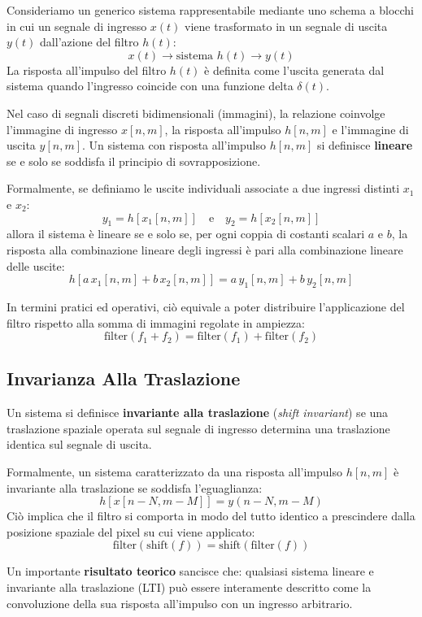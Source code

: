 ﻿\documentclass[11pt, a4paper]{article}
\begin{document}
Consideriamo un generico sistema rappresentabile mediante uno schema a blocchi in cui un segnale di ingresso $x(t)$ viene trasformato in un segnale di uscita $y(t)$ dall'azione del filtro $h(t)$:
\[ x(t) \longrightarrow \boxed{\text{sistema } h(t)} \longrightarrow y(t) \]
La risposta all'impulso del filtro $h(t)$ è definita come l'uscita generata dal sistema quando l'ingresso coincide con una funzione delta $\delta(t)$.

Nel caso di segnali discreti bidimensionali (immagini), la relazione coinvolge l'immagine di ingresso $x[n, m]$, la risposta all'impulso $h[n, m]$ e l'immagine di uscita $y[n, m]$. Un sistema con risposta all'impulso $h[n, m]$ si definisce \textbf{lineare} se e solo se soddisfa il principio di sovrapposizione.

Formalmente, se definiamo le uscite individuali associate a due ingressi distinti $x_1$ e $x_2$:
\[ y_1 = h[x_1[n,m]] \quad \text{e} \quad y_2 = h[x_2[n,m]] \]
allora il sistema è lineare se e solo se, per ogni coppia di costanti scalari $a$ e $b$, la risposta alla combinazione lineare degli ingressi è pari alla combinazione lineare delle uscite:
\[ \boxed{h[a \, x_1[n,m] + b \, x_2[n,m]] = a \, y_1[n,m] + b \, y_2[n,m]} \]

In termini pratici ed operativi, ciò equivale a poter distribuire l'applicazione del filtro rispetto alla somma di immagini regolate in ampiezza:
\[ \text{filter}(f_1 + f_2) = \text{filter}(f_1) + \text{filter}(f_2) \]

\subsection{Invarianza Alla Traslazione}

Un sistema si definisce \textbf{invariante alla traslazione} (\emph{shift invariant}) se una traslazione spaziale operata sul segnale di ingresso determina una traslazione identica sul segnale di uscita.

Formalmente, un sistema caratterizzato da una risposta all'impulso $h[n, m]$ è invariante alla traslazione se soddisfa l'eguaglianza:
\[ \boxed{h[x[n - N, m - M]] = y(n - N, m - M)} \]
Ciò implica che il filtro si comporta in modo del tutto identico a prescindere dalla posizione spaziale del pixel su cui viene applicato:
\[ \text{filter}(\text{shift}(f)) = \text{shift}(\text{filter}(f)) \]

Un importante \textbf{risultato teorico} sancisce che: qualsiasi sistema lineare e invariante alla traslazione (LTI) può essere interamente descritto come la convoluzione della sua risposta all'impulso con un ingresso arbitrario.
\end{document}
